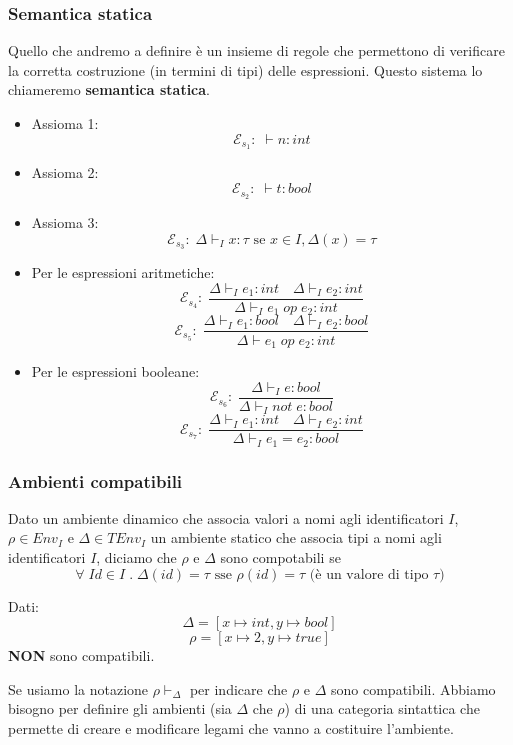\documentclass[a4paper]{article}
\begin{document}
\subsubsection{Semantica statica}

Quello che andremo a definire è un insieme di regole che permettono di verificare
la corretta costruzione (in termini di tipi) delle espressioni. Questo 
sistema lo chiameremo \textbf{semantica statica}.

\begin{itemize}
  \item Assioma 1:
  \[
    \mathcal{E}_{s_1}: \; \vdash n : int 
  \]
  \item Assioma 2:
  \[
    \mathcal{E}_{s_2}: \; \vdash t : bool 
  \]
  \item Assioma 3: 
  \[
    \mathcal{E}_{s_3}: \; \Delta \vdash_{I} x : \tau \text{ se } x \in I, \Delta(x) = \tau
  \]
  \item Per le espressioni aritmetiche:
  \[
    \mathcal{E}_{s_4}: \; \frac{\Delta \vdash_I e_1 : int \quad \Delta \vdash_I e_2 : int}{\Delta \vdash_I e_1 \; op \; e_2 : int} 
  \]
  \[
    \mathcal{E}_{s_5}: \; \frac{\Delta \vdash_I e_1 : bool \quad \Delta \vdash_I e_2 : bool}{\Delta \vdash e_1 \; op \; e_2 : int}
  \]
  \item Per le espressioni booleane:
  \[
    \mathcal{E}_{s_6}: \; \frac{\Delta \vdash_I e : bool}{\Delta \vdash_I not \; e : bool}
  \]
  \[
    \mathcal{E}_{s_7}: \; \frac{\Delta \vdash_I e_1: int \quad \Delta \vdash_I e_2 : int}{\Delta \vdash_I e_1 = e_2 : bool}
  \]
\end{itemize}

\subsubsection{Ambienti compatibili}

{
Dato un ambiente dinamico che associa valori a nomi agli identificatori $I$, $\rho \in Env_I$
e $\Delta \in TEnv_I$ un ambiente statico che associa tipi a nomi agli identificatori $I$, diciamo che 
$\rho$ e $\Delta$ sono compotabili se 
\[
  \forall \; Id \in I \; . \; \Delta(id) = \tau \text{ sse } \rho(id) = \tau \text{ (è un valore di tipo $\tau$)}
\]
}
\begin{Example}{}{}
Dati:
\[\Delta = [x \mapsto int, y \mapsto bool]\]
\[\rho = [x \mapsto 2, y \mapsto true]\]
\textbf{NON} sono compatibili.
\end{Example}
\noindent
Se usiamo la notazione $\rho \vdash_{\Delta}$ per indicare
che $\rho$ e $\Delta$ sono compatibili.
Abbiamo bisogno per definire gli ambienti (sia $\Delta$ che $\rho$)
di una categoria sintattica che permette di creare e 
modificare legami che vanno a costituire l'ambiente.
\end{document}
